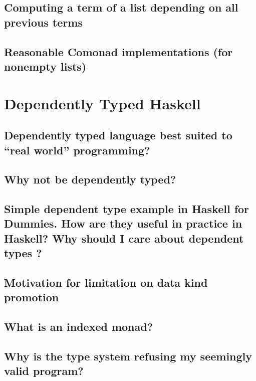 \documentclass{book}
\begin{document}
\section{Computing a term of a list depending on all previous terms}


\section{Reasonable Comonad implementations (for nonempty lists)}



\chapter{Dependently Typed Haskell}

\section{Dependently typed language best suited to “real world” programming?}


\section{Why not be dependently typed?}


\section{Simple dependent type example in Haskell for Dummies. How are they useful in practice in Haskell? Why should I care about dependent types ?}


\section{Motivation for limitation on data kind promotion}


\section{What is an indexed monad?}


\section{Why is the type system refusing my seemingly valid program?}

\end{document}
